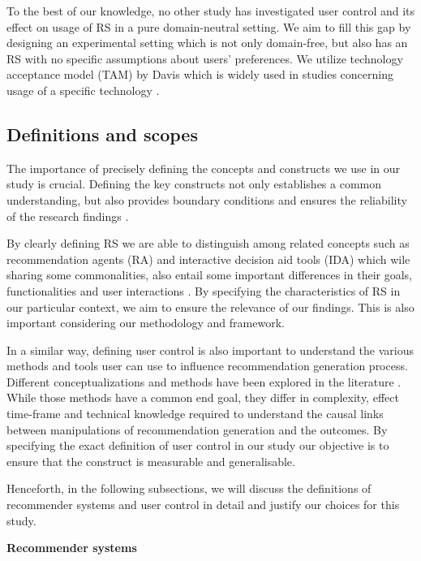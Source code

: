 \documentclass[a4paper,12pt]{article}
\begin{document}
To the best of our knowledge, no other study has investigated user control and its effect on usage of RS in a pure domain-neutral setting. We aim to fill this gap by designing an experimental setting which is not only domain-free, but also has an RS with no specific assumptions about users' preferences. We utilize technology acceptance model (TAM) by Davis which is widely used in studies concerning usage of a specific technology \citep{davis1985technology}.

\subsection{Definitions and scopes}

The importance of precisely defining the concepts and constructs we use in our study is crucial. Defining the key constructs not only establishes a common understanding, but also provides boundary conditions and ensures the reliability of the research findings \citep{creswell2013research}.

By clearly defining RS we are able to distinguish among related concepts such as recommendation agents (RA) and interactive decision aid tools (IDA) which wile sharing some commonalities, also entail some important differences in their goals, functionalities and user interactions \citep{xiao2007commerce}. By specifying the characteristics of RS in our particular context, we aim to ensure the relevance of our findings. This is also important considering our methodology and framework.

In a similar way, defining user control is also important to understand the various methods and tools user can use to influence recommendation generation process. Different conceptualizations and methods have been explored in the literature \citep{pu2012evaluating}. While those methods have a common end goal, they differ in complexity,  effect time-frame and technical knowledge required to understand the causal links between manipulations of recommendation generation and the outcomes. By specifying the exact definition of user control in our study our objective is to ensure that the construct is measurable and generalisable. 

Henceforth, in the following subsections, we will discuss the definitions of recommender systems and user control in detail and justify our choices for this study.

\textbf{Recommender systems}\label{chapter:recommenderSystemsAgentsDifferentiation}
\end{document}
